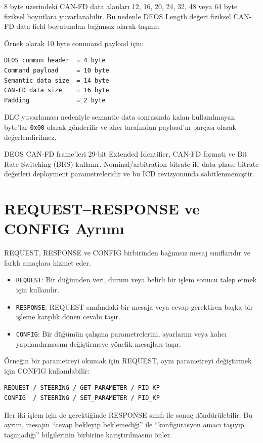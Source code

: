 \documentclass[a4paper,10pt]{article}
\newcommand{\hex}[1]{\texttt{0x#1}}
\newcommand{\code}[1]{\texttt{#1}}
\begin{document}
8 byte üzerindeki CAN-FD data alanları 12, 16, 20, 24, 32, 48 veya 64 byte fiziksel
boyutlara yuvarlanabilir. Bu nedenle DEOS Length değeri fiziksel CAN-FD data field
boyutundan bağımsız olarak taşınır.

Örnek olarak 10 byte command payload için:

\begin{verbatim}
DEOS common header  = 4 byte
Command payload     = 10 byte
Semantic data size  = 14 byte
CAN-FD data size    = 16 byte
Padding             = 2 byte
\end{verbatim}

DLC yuvarlaması nedeniyle semantic data sonrasında kalan kullanılmayan byte'lar \hex{00}
olarak gönderilir ve alıcı tarafından payload'ın parçası olarak değerlendirilmez.

DEOS CAN-FD frame'leri 29-bit Extended Identifier, CAN-FD formatı ve Bit Rate Switching
(BRS) kullanır. Nominal/arbitration bitrate ile data-phase bitrate değerleri deployment
parametreleridir ve bu ICD revizyonunda sabitlenmemiştir.

\section{REQUEST--RESPONSE ve CONFIG Ayrımı}

REQUEST, RESPONSE ve CONFIG birbirinden bağımsız mesaj sınıflarıdır ve farklı amaçlara hizmet eder.

\begin{itemize}
    \item \code{REQUEST}: Bir düğümden veri, durum veya belirli bir işlem sonucu talep etmek için kullanılır.
    \item \code{RESPONSE}: REQUEST sınıfındaki bir mesaja veya cevap gerektiren başka bir işleme karşılık dönen cevabı taşır.
    \item \code{CONFIG}: Bir düğümün çalışma parametrelerini, ayarlarını veya kalıcı yapılandırmasını değiştirmeye yönelik mesajları taşır.
\end{itemize}

Örneğin bir parametreyi okumak için REQUEST, aynı parametreyi değiştirmek için CONFIG
kullanılabilir:

\begin{verbatim}
REQUEST / STEERING / GET_PARAMETER / PID_KP
CONFIG  / STEERING / SET_PARAMETER / PID_KP
\end{verbatim}

Her iki işlem için de gerektiğinde RESPONSE sınıfı ile sonuç döndürülebilir. Bu ayrım,
mesajın ``cevap bekleyip beklemediği'' ile ``konfigürasyon amacı taşıyıp taşımadığı''
bilgilerinin birbirine karıştırılmasını önler.
\end{document}
